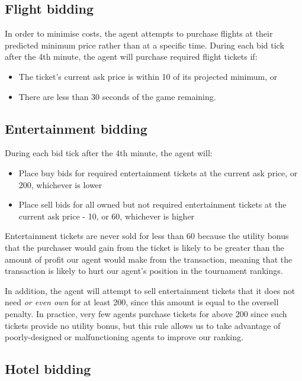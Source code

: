\documentclass[a4paper]{proc}
\begin{document}
\subsection{Flight bidding}

In order to minimise costs, the agent attempts to purchase flights at their predicted minimum price rather than at a specific time. During each bid tick after the 4th minute, the agent will purchase required flight tickets if:

\begin{itemize}
  \item The ticket's current ask price is within 10 of its projected minimum, or
  \item There are less than 30 seconds of the game remaining.
\end{itemize}

\subsection{Entertainment bidding}

During each bid tick after the 4th minute, the agent will:

\begin{itemize}
  \item Place buy bids for required entertainment tickets at the current ask price, or 200, whichever is lower
  \item Place sell bids for all owned but not required entertainment tickets at the current ask price - 10, or 60, whichever is higher
\end{itemize}

Entertainment tickets are never sold for less than 60 because the utility bonus that the purchaser would gain from the ticket is likely to be greater than the amount of profit our agent would make from the transaction, meaning that the transaction is likely to hurt our agent's position in the tournament rankings.

In addition, the agent will attempt to sell entertainment tickets that it does not need \emph{or even own} for at least 200, since this amount is equal to the oversell penalty. In practice, very few agents purchase tickets for above 200 since such tickets provide no utility bonus, but this rule allows us to take advantage of poorly-designed or malfunctioning agents to improve our ranking.

\subsection{Hotel bidding}
\end{document}
